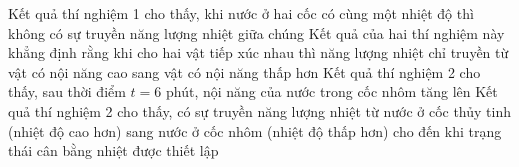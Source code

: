 \begin{ex}
		{\True Kết quả thí nghiệm 1 cho thấy, khi nước ở hai cốc có cùng một nhiệt độ thì không có sự truyền năng lượng nhiệt giữa chúng}
		{Kết quả của hai thí nghiệm này khẳng định rằng khi cho hai vật tiếp xúc nhau thì năng lượng nhiệt chỉ truyền từ vật có nội năng cao sang vật có nội năng thấp hơn}
		{Kết quả thí nghiệm 2 cho thấy, sau thời điểm $t=6$ phút, nội năng của nước trong cốc nhôm tăng lên}
		{\True Kết quả thí nghiệm 2 cho thấy, có sự truyền năng lượng nhiệt từ nước ở cốc thủy tinh (nhiệt độ cao hơn) sang nước ở cốc nhôm (nhiệt độ thấp hơn) cho đến khi trạng thái cân bằng nhiệt được thiết lập}
	\end{ex}

